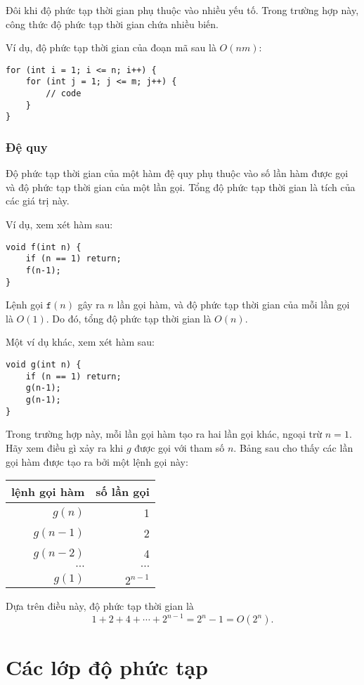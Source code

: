 Đôi khi độ phức tạp thời gian phụ thuộc vào
nhiều yếu tố.
Trong trường hợp này, công thức độ phức tạp thời gian
chứa nhiều biến.

Ví dụ, độ phức tạp thời gian của
đoạn mã sau là $O(nm)$:

\begin{lstlisting}
for (int i = 1; i <= n; i++) {
    for (int j = 1; j <= m; j++) {
        // code
    }
}
\end{lstlisting}

\subsubsection*{Đệ quy}

Độ phức tạp thời gian của một hàm đệ quy
phụ thuộc vào số lần hàm được gọi
và độ phức tạp thời gian của một lần gọi.
Tổng độ phức tạp thời gian là tích của
các giá trị này.

Ví dụ, xem xét hàm sau:
\begin{lstlisting}
void f(int n) {
    if (n == 1) return;
    f(n-1);
}
\end{lstlisting}
Lệnh gọi $\texttt{f}(n)$ gây ra $n$ lần gọi hàm,
và độ phức tạp thời gian của mỗi lần gọi là $O(1)$.
Do đó, tổng độ phức tạp thời gian là $O(n)$.

Một ví dụ khác, xem xét hàm sau:
\begin{lstlisting}
void g(int n) {
    if (n == 1) return;
    g(n-1);
    g(n-1);
}
\end{lstlisting}
Trong trường hợp này, mỗi lần gọi hàm tạo ra hai
lần gọi khác, ngoại trừ $n=1$.
Hãy xem điều gì xảy ra khi $g$ được gọi
với tham số $n$.
Bảng sau cho thấy các lần gọi hàm
được tạo ra bởi một lệnh gọi này:
\begin{center}
\begin{tabular}{rr}
lệnh gọi hàm & số lần gọi \\
\hline
$g(n)$ & 1 \\
$g(n-1)$ & 2 \\
$g(n-2)$ & 4 \\
$\cdots$ & $\cdots$ \\
$g(1)$ & $2^{n-1}$ \\
\end{tabular}
\end{center}
Dựa trên điều này, độ phức tạp thời gian là
\[1+2+4+\cdots+2^{n-1} = 2^n-1 = O(2^n).\]

\section{Các lớp độ phức tạp}

